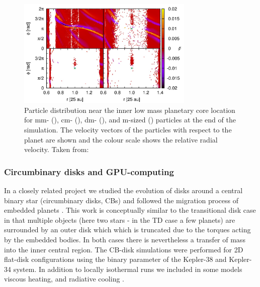 \documentclass[10pt,fleqn,twoside]{article}
\begin{document}
\begin{figure}[t]
\centerline{\includegraphics[width=0.75\textwidth]{pics/particles.jpg}}
\caption{\label{fig:particles} Particle distribution near the inner low mass
  planetary core location for mm- (), cm-
  (), dm- (), and m-sized
  () particles at the end of the simulation.  The
  velocity vectors of the particles with respect to the planet are shown and
  the colour scale shows the relative radial velocity.  Taken from:
  \citet{2015A&A...584A.110P}}
\end{figure}

\subsubsection{Circumbinary disks and GPU-computing}
In a closely related project we studied the evolution of disks around a central
binary star (circumbinary disks, CBs) and followed the migration process of embedded planets
\citep{2014A&A...564A..72K,2015A&A...581A..20K}. This work is conceptually similar to the  
transitional disk case in that multiple objects (here two stars - in the TD case a few planets) are surrounded by an
outer disk which which is truncated due to the torques acting by the embedded bodies.
In both cases there is nevertheless a transfer of mass into the inner central region.
The CB-disk simulations were performed for 2D flat-disk configurations using the binary parameter of
the Kepler-38 and Kepler-34 system. In addition to locally isothermal runs we included
in some models viscous heating, and radiative cooling \citep{2008A&A...487L...9K}. 
\end{document}
